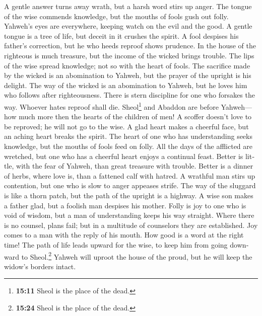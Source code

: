 \begin{paracol}{2}
\begin{otherlanguage}{english}
 A gentle answer turns away wrath, but a harsh word stirs
up anger.  The tongue of the wise commends knowledge, but
the mouths of fools gush out folly.  Yahweh's eyes are
everywhere, keeping watch on the evil and the good.  A
gentle tongue is a tree of life, but deceit in it crushes the spirit.
 A fool despises his father's correction, but he who heeds
reproof shows prudence.  In the house of the righteous is
much treasure, but the income of the wicked brings trouble.
 The lips of the wise spread knowledge; not so with the
heart of fools.  The sacrifice made by the wicked is an
abomination to Yahweh, but the prayer of the upright is his delight.
 The way of the wicked is an abomination to Yahweh, but he
loves him who follows after righteousness.  There is
stern discipline for one who forsakes the way. Whoever hates reproof
shall die.  Sheol\footnote{\textbf{15:11} Sheol is the
  place of the dead.} and Abaddon are before Yahweh--- how much more
then the hearts of the children of men!  A scoffer
doesn't love to be reproved; he will not go to the wise. 
A glad heart makes a cheerful face, but an aching heart breaks the
spirit.  The heart of one who has understanding seeks
knowledge, but the mouths of fools feed on folly.  All
the days of the afflicted are wretched, but one who has a cheerful heart
enjoys a continual feast.  Better is little, with the
fear of Yahweh, than great treasure with trouble.  Better
is a dinner of herbs, where love is, than a fattened calf with hatred.
 A wrathful man stirs up contention, but one who is slow
to anger appeases strife.  The way of the sluggard is
like a thorn patch, but the path of the upright is a highway.
 A wise son makes a father glad, but a foolish man
despises his mother.  Folly is joy to one who is void of
wisdom, but a man of understanding keeps his way straight.
 Where there is no counsel, plans fail; but in a
multitude of counselors they are established.  Joy comes
to a man with the reply of his mouth. How good is a word at the right
time!  The path of life leads upward for the wise, to
keep him from going downward to Sheol.\footnote{\textbf{15:24} Sheol is
  the place of the dead.}  Yahweh will uproot the house
of the proud, but he will keep the widow's borders intact.

\end{otherlanguage}
\end{paracol}
